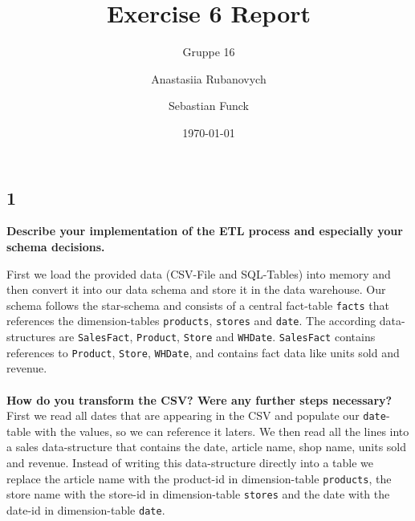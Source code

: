 \documentclass[a4paper,english,abstract=on]{scrartcl}
\title{Exercise 6 Report}
\subtitle{Gruppe 16}
\author{Anastasiia Rubanovych\and Sebastian Funck}
\date{\today}
\begin{document}
\maketitle

\subsection*{1}
\textbf{Describe your implementation of the ETL process and especially your schema decisions.}

First we load the provided data (CSV-File and SQL-Tables) into memory and then convert it into our data schema and store it in the data warehouse. Our schema follows the star-schema and consists of a central fact-table \texttt{facts} that references the dimension-tables \texttt{products}, \texttt{stores} and \texttt{date}. The according data-structures are \texttt{SalesFact}, \texttt{Product}, \texttt{Store} and \texttt{WHDate}. \texttt{SalesFact} contains references to \texttt{Product}, \texttt{Store}, \texttt{WHDate}, and contains fact data like units sold and revenue.
~\\~\\
\textbf{How do you transform the CSV? Were any further steps necessary?}
First we read all dates that are appearing in the CSV and populate our \texttt{date}-table with the values, so we can reference it laters. We then read all the lines into a sales data-structure that contains the date, article name, shop name, units sold and revenue. Instead of writing this data-structure directly into a table we replace the article name with the product-id in dimension-table \texttt{products}, the store name with the store-id in dimension-table \texttt{stores} and the date with the date-id in dimension-table \texttt{date}.
\end{document}
